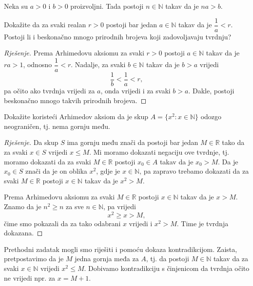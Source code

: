 \begin{remark}
Neka su $a>0$ i $b>0$ proizvoljni. Tada postoji $n\in \mathbb{N}$ takav da je $na>b$.
\end{remark}
\begin{exercise}
Dokažite da za svaki realan $r>0$ postoji bar jedan $a\in \mathbb{N}$ takav da je $\dfrac{1}{a}<r$. Postoji li i beskonačno mnogo prirodnih brojeva koji zadovoljavaju tvrdnju?
\end{exercise}
\begin{proof}[Rješenje]
Prema Arhimedovu aksiomu za svaki $r>0$ postoji $a\in \mathbb{N}$ takav da je $ra>1$, odnosno $\dfrac{1}{a}<r$. Nadalje, za svaki $b\in \mathbb{N}$ takav da je $b>a$ vrijedi $$\dfrac{1}{b}<\dfrac{1}{a}<r,$$ pa očito ako tvrdnja vrijedi za $a$, onda vrijedi i za svaki $b>a$. Dakle, postoji beskonačno mnogo takvih prirodnih brojeva.
\end{proof}
\begin{exercise}
\label{12}
Dokažite koristeći Arhimedov aksiom da je skup $A=\{x^2 : x\in \mathbb{N}\}$ odozgo neograničen, tj. nema gornju među.
\end{exercise}
\begin{proof}[Rješenje]
Da skup $S$ ima gornju među znači da postoji bar jedan $M\in \mathbb{R}$ tako da za svaki $x\in S$ vrijedi $x\leq M$. Mi moramo dokazati negaciju ove tvrdnje, tj. moramo dokazati da za svaki $M\in \mathbb{R}$ postoji $x_0\in A$ takav da je $x_0>M$. Da je $x_0\in S$ znači da je on oblika $x^2$, gdje je $x\in \mathbb{N}$, pa zapravo trebamo dokazati da za svaki $M\in \mathbb{R}$ postoji $x\in \mathbb{N}$ takav da je $x^2>M$. 

Prema Arhimedovu aksiomu za svaki $M\in \mathbb{R}$ postoji $x\in \mathbb{N}$ takav da je $x>M$. Znamo da je $n^2\geq n$ za sve $n\in \mathbb{N}$, pa vrijedi $$x^2\geq x>M,$$ 
čime smo pokazali da za tako odabrani $x$ vrijedi i $x^2>M$. Time je tvrdnja dokazana.
\end{proof}
\begin{remark}
Prethodni zadatak mogli smo riješiti i pomoću dokaza kontradikcijom. Zaista, pretpostavimo da je $M$ jedna gornja međa za $A$, tj. da postoji $M\in \mathbb{N}$ takav da za svaki $x\in \mathbb{N}$ vrijedi $x^2\leq M$. Dobivamo kontradikciju s činjenicom da tvrdnja očito ne vrijedi npr. za $x=M+1$.
\end{remark}

